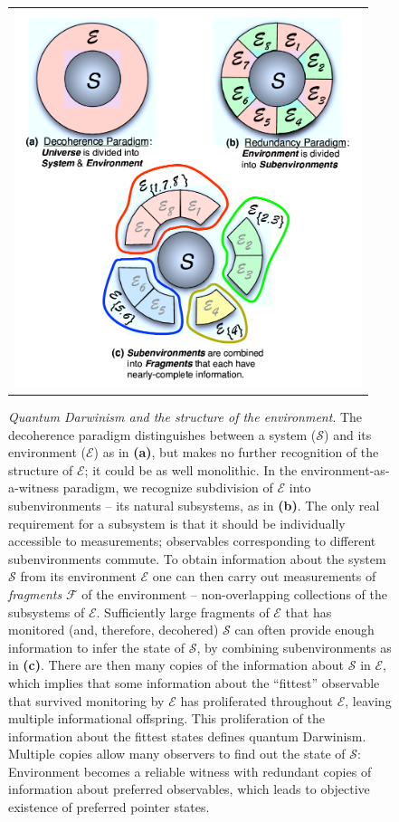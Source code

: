 \documentclass[aps,rmp,epsfig,11pt]{revtex4}
\newcommand{\Sys}{\ensuremath{\mathcal{S}}}
\newcommand{\Env}{\ensuremath{\mathcal{E}}}
\def\FCW{0.98\columnwidth}
\newcommand{\cS}        {{\mathcal S}}
\newcommand{\cE}        {{\mathcal E}}
\newcommand{\+}         {\dagger}
\newcommand\cF{{\mathcal F}}
\begin{document}
\begin{figure}[htb]
\begin{tabular}{l}
\vspace{-0.15in} \includegraphics[width=4.0in]{EnvSubdivision.pdf}\\
\end{tabular}
\caption{\footnotesize \emph{Quantum Darwinism and the structure of the environment}.  The decoherence paradigm distinguishes between a system ($\Sys$) and its environment ($\Env$) as in \textbf{(a)}, but makes no further recognition of the structure of $\cE$; it could be as well monolithic.  In the environment-as-a-witness paradigm, we recognize subdivision of $\Env$ into subenvironments -- its natural subsystems, as in \textbf{(b)}. The only real requirement for a subsystem is that it should be individually accessible to measurements; observables corresponding to different subenvironments commute. To obtain information about the system $\cS$ from its environment $\cE$ one can then carry out measurements 
of \emph{fragments} $\cF$ of the environment -- non-overlapping collections of the subsystems of $\cE$.  Sufficiently large fragments of $\cE$ that has monitored (and, therefore, decohered) $\cS$ can often 
provide enough information to infer the state of $\Sys$, by combining subenvironments as in \textbf{(c)}.  
There are then many copies of the information about $\cS$ in $\cE$, which implies that some information 
about the ``fittest'' observable that survived monitoring by $\cE$ has proliferated throughout $\cE$, leaving multiple informational offspring. This proliferation of the information about the fittest states defines
quantum Darwinism. Multiple copies allow many observers to find out the state of $\cS$: Environment becomes a reliable witness with redundant copies of information about preferred
observables, which leads to objective existence of preferred pointer states.}
\label{EnvSubdivision}
\end{figure}
\end{document}
